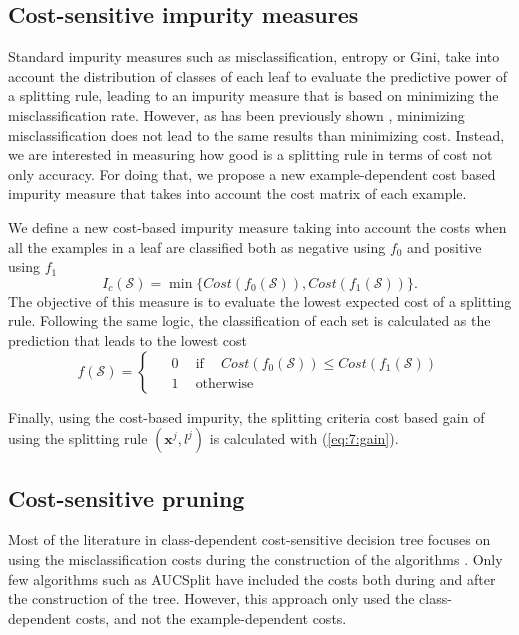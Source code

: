 	\subsection{Cost-sensitive impurity measures}

		Standard impurity measures such as misclassification, entropy or Gini, take into account the 
		distribution of classes of each leaf to evaluate the predictive power of a splitting rule,
		leading to an impurity measure that is based on minimizing the misclassification rate. However, 
		as has been previously shown \citep{CorreaBahnsen2013}, minimizing misclassification does not 
		lead to the same results than minimizing cost. Instead, we are interested in measuring how good 
		is a splitting rule in terms of cost not only accuracy. For doing that, we propose a new 
		example-dependent cost based impurity measure that takes into account the cost matrix of each 
		example.

		We define a new cost-based impurity measure taking into account the costs when all the examples
		in a leaf are classified both as negative using $f_0$ and positive using $f_1$
		\begin{equation}\label{eq:cost_impurity}
			I_c(\mathcal{S}) = \min \bigg\{ Cost(f_0(\mathcal{S})), Cost(f_1(\mathcal{S})) \bigg\}.
		\end{equation}
		The objective of this measure is to evaluate the lowest expected cost of a splitting rule.
		Following the same logic, the classification of each set is calculated as the prediction that 
		leads to the lowest cost
	  \begin{equation}\label{eq_pred}
	    f(\mathcal{S}) = 
	    \begin{cases}
	      \phantom{-}0 \phantom{-} \mbox{if} \phantom{-} Cost(f_0(\mathcal{S})) \le 
        Cost(f_1(\mathcal{S}))\\
	      \phantom{-}1 \phantom{-}\mbox{otherwise}
	    \end{cases}
	  \end{equation}

		Finally, using the cost-based impurity, the splitting criteria cost based gain of using the 
		splitting rule $(\mathbf{x}^j,l^j)$ is calculated with (\ref{eq:7:gain}). 

	\subsection{Cost-sensitive pruning}
 
		Most of the literature in class-dependent cost-sensitive decision tree focuses on using the 
		misclassification costs during the construction of the algorithms \citep{Lomax2013}. Only few 
		algorithms such as AUCSplit \citep{Ferri2002} have \mbox{included} the costs both during and 
		after the construction of the tree. However, this approach only used the class-dependent costs, 
		and not the example-dependent costs.
 

